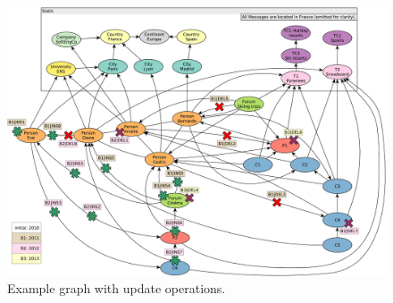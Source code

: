 \begin{figure}[ht]
    \centering
    \includegraphics[scale=\yedscale]{figures/example-graph-with-updates}
    \caption{Example graph with update operations.}
    \label{fig:example-graph-with-updates}
\end{figure}
